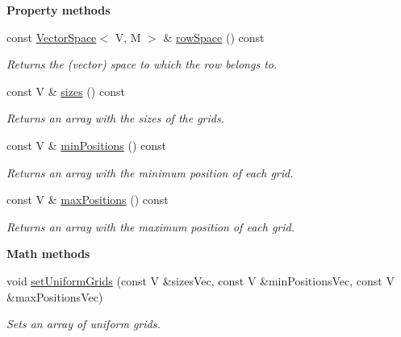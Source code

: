 \begin{Indent}{\bf Property methods}\par
\begin{DoxyCompactItemize}
\item 
const \hyperlink{class_q_u_e_s_o_1_1_vector_space}{Vector\-Space}$<$ V, M $>$ \& \hyperlink{class_q_u_e_s_o_1_1_array_of_one_d_grids_a07aee362e04f713c139730c991de9baa}{row\-Space} () const 
\begin{DoxyCompactList}\small\item\em Returns the (vector) space to which the row belongs to. \end{DoxyCompactList}\item 
const V \& \hyperlink{class_q_u_e_s_o_1_1_array_of_one_d_grids_a2035c97cda24870644070eae0f8ecfae}{sizes} () const 
\begin{DoxyCompactList}\small\item\em Returns an array with the sizes of the grids. \end{DoxyCompactList}\item 
const V \& \hyperlink{class_q_u_e_s_o_1_1_array_of_one_d_grids_a9230fc37403bb00ecd27ad842eb01c2b}{min\-Positions} () const 
\begin{DoxyCompactList}\small\item\em Returns an array with the minimum position of each grid. \end{DoxyCompactList}\item 
const V \& \hyperlink{class_q_u_e_s_o_1_1_array_of_one_d_grids_a958f92e18bcab93e1866ec67b18e408b}{max\-Positions} () const 
\begin{DoxyCompactList}\small\item\em Returns an array with the maximum position of each grid. \end{DoxyCompactList}\end{DoxyCompactItemize}
\end{Indent}
\begin{Indent}{\bf Math methods}\par
\begin{DoxyCompactItemize}
\item 
void \hyperlink{class_q_u_e_s_o_1_1_array_of_one_d_grids_a143a91500dd5cbc18dd9f8ec912f21d1}{set\-Uniform\-Grids} (const V \&sizes\-Vec, const V \&min\-Positions\-Vec, const V \&max\-Positions\-Vec)
\begin{DoxyCompactList}\small\item\em Sets an array of uniform grids. \end{DoxyCompactList}\end{DoxyCompactItemize}
\end{Indent}
